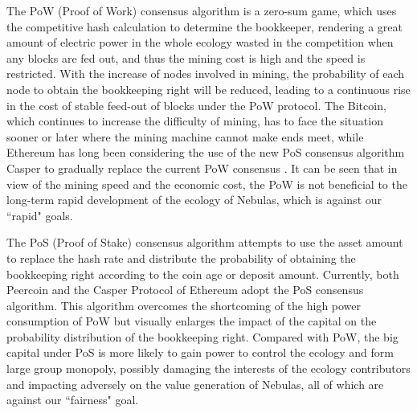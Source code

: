 The PoW (Proof of Work) consensus algorithm is a zero-sum game, which uses the competitive hash calculation to determine the bookkeeper, rendering a great amount of electric power in the whole ecology wasted in the competition when any blocks are fed out, and thus the mining cost is high and the speed is restricted. With the increase of nodes involved in mining, the probability of each node to obtain the bookkeeping right will be reduced, leading to a continuous rise in the cost of stable feed-out of blocks under the PoW protocol. The Bitcoin, which continues to increase the difficulty of mining, has to face the situation sooner or later where the mining machine cannot make ends meet, while Ethereum has long been considering the use of the new PoS consensus algorithm Casper \cite{casper} to gradually replace the current PoW consensus \cite{buterin2013ethereum}. It can be seen that in view of the mining speed and the economic cost, the PoW is not beneficial to the long-term rapid development of the ecology of Nebulas, which is against our ``rapid" goals.


The PoS (Proof of Stake) consensus algorithm attempts to use the asset amount to replace the hash rate and distribute the probability of obtaining the bookkeeping right according to the coin age or deposit amount. Currently, both Peercoin \cite{king2012peercoin} and the Casper Protocol of Ethereum adopt the PoS consensus algorithm. This algorithm overcomes the shortcoming of the high power consumption of PoW but visually enlarges the impact of the capital on the probability distribution of the bookkeeping right. Compared with PoW, the big capital under PoS is more likely to gain power to control the ecology and form large group monopoly, possibly damaging the interests of the ecology contributors and impacting adversely on the value generation of Nebulas, all of which are against our ``fairness" goal.


